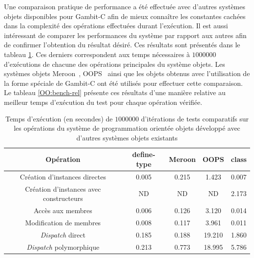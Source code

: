\documentclass[12pt,twoside,letterpaper,francais]{book}
\newcommand{\scheme}[1]{\selectlanguage{english}{\tt #1}\selectlanguage{french}}
\begin{document}
Une comparaison pratique de performance a été effectuée avec d'autres
systèmes objets disponibles pour Gambit-C afin de mieux connaître les
constantes cachées dans la complexité des opérations effectuées durant
l'exécution. Il est aussi intéressant de comparer les performances du
système par rapport aux autres afin de confirmer l'obtention du
résultat désiré. Ces résultats sont présentés dans le tableau
\ref{OO:bench}. Ces derniers correspondent aux temps nécessaires à $1
000 000$ d'exécutions de chacune des opérations principales du système
objets. Les systèmes objets Meroon~\cite{MEROON}, OOPS~\cite{OOPS}
ainsi que les objets obtenus avec l'utilisation de la forme spéciale
\scheme{define-type} de Gambit-C ont été utilisés pour effectuer cette
comparaison. Le tableau \ref{OO:bench-rel} présente ces résultats
d'une manière relative au meilleur temps d'exécution du test pour
chaque opération vérifiée.

\begin{table}
  \center
  \begin{tabular}{ccccc}
    \hline
    Opération & define-type & Meroon & OOPS & class \\
    \hline \hline
    Création d'instances directes           & 0.005 & 0.215 & 1.423 & 0.007\\
    Création d'instances avec constructeurs & ND    & ND    & ND    & 2.173\\
    Accès aux membres                       & 0.006 & 0.126 & 3.120 & 0.014\\
    Modification de membres                 & 0.008 & 0.117 & 3.961 & 0.011\\
    \textit{Dispatch} direct                & 0.185 & 0.188 & 19.210 & 1.860\\
    \textit{Dispatch} polymorphique         & 0.213 & 0.773 & 18.995 & 5.786\\
    \hline
  \end{tabular}
  \caption{Temps d'exécution (en secondes) de $1 000 000$ d'itérations
    de tests comparatifs sur les opérations du système de
    programmation orientée objets développé avec d'autres systèmes
    objets existants}
  \label{OO:bench}
\end{table}
\end{document}
